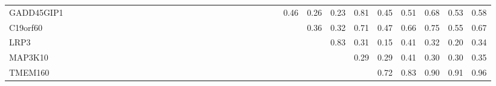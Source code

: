 \begin{longtable}{lrrrrrrrrrrrrrrrrrrrrrrrrrrrrrrrrrr}
GADD45GIP1    &            &                    &              &            &               &            &             &              &            &            &               &            &               &               &              &             &             &             &             &                &                &              &               &                     &                  &           0.46 &       0.26 &          0.23 &          0.81 &       0.45 &       0.51 &         0.68 &           0.53 &          0.58 \\
C19orf60      &            &                    &              &            &               &            &             &              &            &            &               &            &               &               &              &             &             &             &             &                &                &              &               &                     &                  &                &       0.36 &          0.32 &          0.71 &       0.47 &       0.66 &         0.75 &           0.55 &          0.67 \\
LRP3          &            &                    &              &            &               &            &             &              &            &            &               &            &               &               &              &             &             &             &             &                &                &              &               &                     &                  &                &            &          0.83 &          0.31 &       0.15 &       0.41 &         0.32 &           0.20 &          0.34 \\
MAP3K10       &            &                    &              &            &               &            &             &              &            &            &               &            &               &               &              &             &             &             &             &                &                &              &               &                     &                  &                &            &               &          0.29 &       0.29 &       0.41 &         0.30 &           0.30 &          0.35 \\
TMEM160       &            &                    &              &            &               &            &             &              &            &            &               &            &               &               &              &             &             &             &             &                &                &              &               &                     &                  &                &            &               &               &       0.72 &       0.83 &         0.90 &           0.91 &          0.96 \\

\end{longtable}
